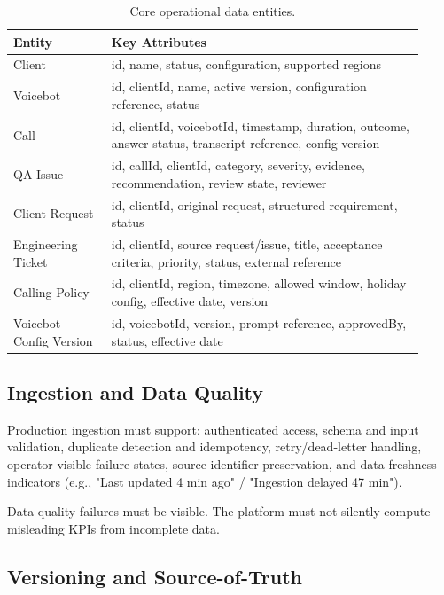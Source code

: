 \documentclass[11pt,a4paper]{article}
\begin{document}
\begin{table}[H]
\centering
\small
\begin{tabular}{p{0.22\linewidth}p{0.70\linewidth}}
\toprule
\textbf{Entity} & \textbf{Key Attributes} \\
\midrule
Client                       & id, name, status, configuration, supported regions \\
Voicebot                     & id, clientId, name, active version, configuration reference, status \\
Call                         & id, clientId, voicebotId, timestamp, duration, outcome, answer status, transcript reference, config version \\
QA Issue                     & id, callId, clientId, category, severity, evidence, recommendation, review state, reviewer \\
Client Request               & id, clientId, original request, structured requirement, status \\
Engineering Ticket           & id, clientId, source request/issue, title, acceptance criteria, priority, status, external reference \\
Calling Policy               & id, clientId, region, timezone, allowed window, holiday config, effective date, version \\
Voicebot Config Version      & id, voicebotId, version, prompt reference, approvedBy, status, effective date \\
\bottomrule
\end{tabular}
\caption{Core operational data entities.}
\end{table}

\subsection{Ingestion and Data Quality}

Production ingestion must support: authenticated access, schema and input validation, duplicate detection and idempotency, retry/dead-letter handling, operator-visible failure states, source identifier preservation, and data freshness indicators (e.g., "Last updated 4 min ago" / "Ingestion delayed 47 min").

Data-quality failures must be visible. The platform must not silently compute misleading KPIs from incomplete data.

\subsection{Versioning and Source-of-Truth}
\end{document}
